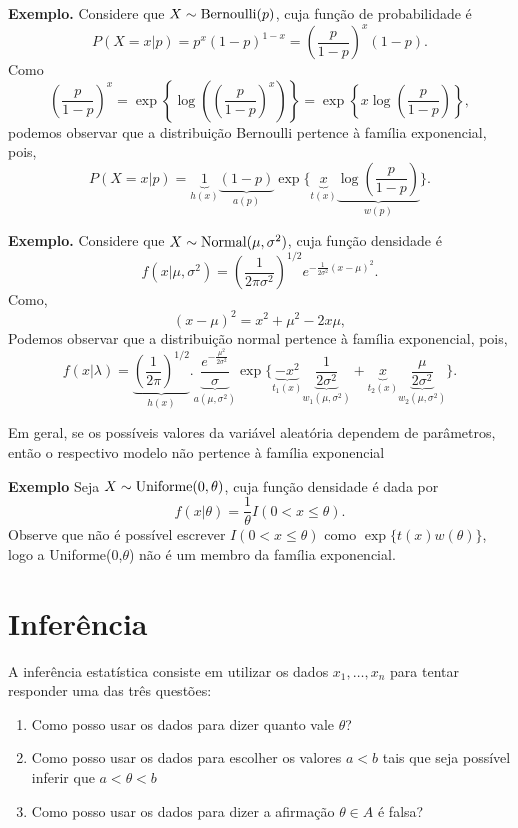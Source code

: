 \documentclass[
  letterpaper,
  DIV=11,
  numbers=noendperiod]{scrreprt}
\providecommand{\tightlist}{%
  \setlength{\itemsep}{0pt}\setlength{\parskip}{0pt}}\usepackage{longtable,booktabs,array}
\begin{document}
\textbf{Exemplo.} Considere que \(X\sim\hbox{Bernoulli}(p)\), cuja
função de probabilidade é
\[P(X=x|p)=p^x (1-p)^{1-x}=\left(\frac{p}{1-p}\right)^x (1-p).\] Como
\[\left(\frac{p}{1-p}\right)^x = \exp\left\{\log\left(\left(\frac{p}{1-p}\right)^x\right)\right\}=\exp\left\{x\log\left(\frac{p}{1-p}\right)\right\},\]
podemos observar que a distribuição Bernoulli pertence à família
exponencial, pois,
\[P(X=x|p)=\underbrace{1}_{h(x)}\underbrace{(1-p)}_{a(p)}\exp\{\underbrace{x}_{t(x)}\underbrace{\log\left(\frac{p}{1-p}\right)}_{w(p)}\}.\]

\textbf{Exemplo.} Considere que \(X\sim\hbox{Normal}(\mu,\sigma^2)\),
cuja função densidade é
\[f(x|\mu,\sigma^2)=\left(\frac{1}{2\pi\sigma^2}\right)^{1/2} e^{-\frac{1}{2\sigma^2}(x-\mu)^2}.\]
Como, \[(x-\mu)^2=x^2+\mu^2-2x\mu,\] Podemos observar que a distribuição
normal pertence à família exponencial, pois,
\[f(x|\lambda)=\underbrace{\left(\frac{1}{2\pi}\right)^{1/2}}_{h(x)}.\underbrace{\frac{e^{-\frac{\mu^2}{2\sigma^2}}}{\sigma}}_{a(\mu,\sigma^2)}\exp\{\underbrace{-x^2}_{t_1(x)}\underbrace{\frac{1}{2\sigma^2}}_{w_1(\mu,\sigma^2)}+\underbrace{x}_{t_2(x)}\underbrace{\frac{\mu}{2\sigma^2}}_{w_2(\mu,\sigma^2)}\}.\]

Em geral, se os possíveis valores da variável aleatória dependem de
parâmetros, então o respectivo modelo não pertence à família exponencial

\textbf{Exemplo} Seja \(X\sim\hbox{Uniforme}(0,\theta)\), cuja função
densidade é dada por \[f(x|\theta)=\frac{1}{\theta}I(0< x\leq \theta).\]
Observe que não é possível escrever \(I(0<x\leq \theta)\) como
\(\exp\{t(x)w(\theta)\}\), logo a Uniforme(0,\(\theta\)) não é um membro
da família exponencial.

\section{Inferência}\label{inferuxeancia}

A inferência estatística consiste em utilizar os dados
\(x_1,\ldots,x_n\) para tentar responder uma das três questões:

\begin{enumerate}
\def\labelenumi{\arabic{enumi}.}
\tightlist
\item
  Como posso usar os dados para dizer quanto vale \(\theta\)?
\item
  Como posso usar os dados para escolher os valores \(a<b\) tais que
  seja possível inferir que \(a<\theta<b\)
\item
  Como posso usar os dados para dizer a afirmação \(\theta\in A\) é
  falsa?
\end{enumerate}
\end{document}
